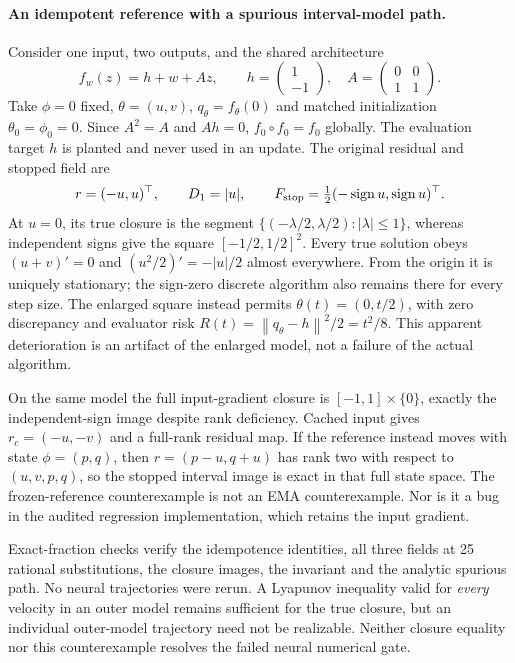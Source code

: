 \documentclass[11pt,a4paper]{article}
\newcommand{\norm}[1]{\left\lVert #1\right\rVert}
\begin{document}
\paragraph{An idempotent reference with a spurious interval-model path.}
Consider one input, two outputs, and the shared architecture
\[
 f_w(z)=h+w+Az,\qquad
 h=\begin{pmatrix}1\\-1\end{pmatrix},\quad
 A=\begin{pmatrix}0&0\\1&1\end{pmatrix}.
\]
Take $\phi=0$ fixed, $\theta=(u,v)$, $q_\theta=f_\theta(0)$ and
matched initialization $\theta_0=\phi_0=0$. Since $A^2=A$ and $Ah=0$,
$f_0\circ f_0=f_0$ globally. The evaluation target $h$ is planted and
never used in an update. The original residual and stopped field are
\[
 r=(-u,u)^\top,\qquad D_1=|u|,\qquad
 F_{\rm stop}=\tfrac12(-\operatorname{sign}u,\operatorname{sign}u)^\top.
\]
At $u=0$, its true closure is the segment
$\{(-\lambda/2,\lambda/2):|\lambda|\le1\}$, whereas independent signs
give the square $[-1/2,1/2]^2$. Every true solution obeys
$(u+v)'=0$ and $(u^2/2)'=-|u|/2$ almost everywhere. From the origin
it is uniquely stationary; the sign-zero discrete algorithm also remains
there for every step size. The enlarged square instead permits
$\theta(t)=(0,t/2)$, with zero discrepancy and evaluator risk
$R(t)=\norm{q_\theta-h}^2/2=t^2/8$. This apparent deterioration is an
artifact of the enlarged model, not a failure of the actual algorithm.

On the same model the full input-gradient closure is
$[-1,1]\times\{0\}$, exactly the independent-sign image despite rank
deficiency. Cached input gives $r_c=(-u,-v)$ and a full-rank residual
map. If the reference instead moves with state $\phi=(p,q)$, then
$r=(p-u,q+u)$ has rank two with respect to $(u,v,p,q)$, so the stopped
interval image is exact in that full state space. The frozen-reference
counterexample is not an EMA counterexample. Nor is it a bug in the
audited regression implementation, which retains the input gradient.

Exact-fraction checks verify the idempotence identities, all three fields
at 25 rational substitutions, the closure images, the invariant and
the analytic spurious path. No neural trajectories were rerun. A Lyapunov
inequality valid for \emph{every} velocity in an outer model remains
sufficient for the true closure, but an individual outer-model trajectory
need not be realizable. Neither closure equality nor this counterexample
resolves the failed neural numerical gate.
\end{document}
